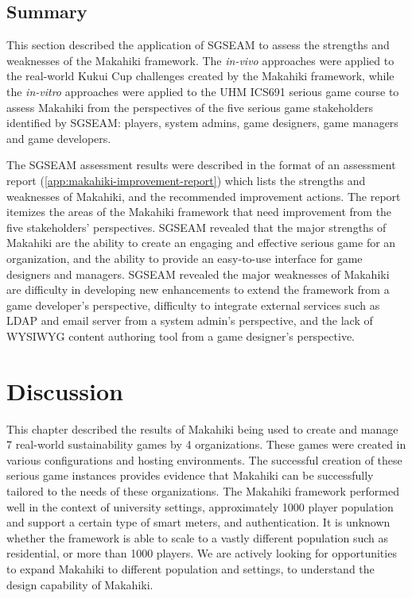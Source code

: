 \subsection{Summary}

This section described the application of SGSEAM to assess the strengths and weaknesses of the Makahiki framework. The {\em in-vivo} approaches were applied to the real-world Kukui Cup challenges created by the Makahiki framework, while the {\em in-vitro} approaches were applied to the UHM ICS691 serious game course to assess Makahiki from the perspectives of the five serious game stakeholders identified by SGSEAM: players, system admins, game designers, game managers and game developers.

The SGSEAM assessment results were described in the format of an assessment report (\autoref{app:makahiki-improvement-report}) which lists the strengths and weaknesses of Makahiki, and the recommended improvement actions. The report itemizes the areas of the Makahiki framework that need improvement from the five stakeholders' perspectives. SGSEAM revealed that the major strengths of Makahiki are the ability to create an engaging and effective serious game for an organization, and the ability to provide an easy-to-use interface for game designers and managers. SGSEAM revealed the major weaknesses of Makahiki are difficulty in developing new enhancements to extend the framework from a game developer's perspective, difficulty to integrate external services such as LDAP and email server from a system admin's perspective, and the lack of WYSIWYG content authoring tool from a game designer's perspective.

\section{Discussion}

This chapter described the results of Makahiki being used to create and manage 7 real-world sustainability games by 4 organizations. These games were created in various configurations and hosting environments. The successful creation of these serious game instances provides evidence that Makahiki can be successfully tailored to the needs of these organizations. The Makahiki framework performed well in the context of university settings, approximately 1000 player population and support a certain type of smart meters, and authentication. It is unknown whether the framework is able to scale to a vastly different population such as residential, or more than 1000 players. We are actively looking for opportunities to expand Makahiki to different population and settings, to understand the design capability of Makahiki.

